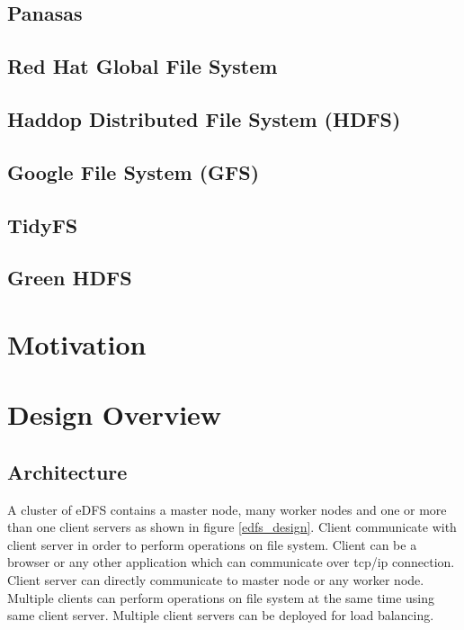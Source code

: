 \documentclass[a4paper,12pt]{article}
\begin{document}
\subsection{Panasas}

\subsection{Red Hat Global File System}

\subsection{Haddop Distributed File System (HDFS) \cite{hadoop}}

\subsection{Google File System (GFS) \cite{ghemawat03}}

\subsection{TidyFS \cite{tidyfs}}

\subsection{Green HDFS}

\section{Motivation}

\section{Design Overview}
\subsection{Architecture}
A cluster of eDFS contains a master node, many worker nodes and one or more than one client servers as shown in figure \ref{edfs_design}. Client communicate with client server in order to perform operations on file system. Client can be a browser or any other application which can communicate over tcp/ip connection. Client server can directly communicate to master node or any worker node. Multiple clients can perform operations on file system at the same time using same client server. Multiple client servers can be deployed for load balancing.
\end{document}
